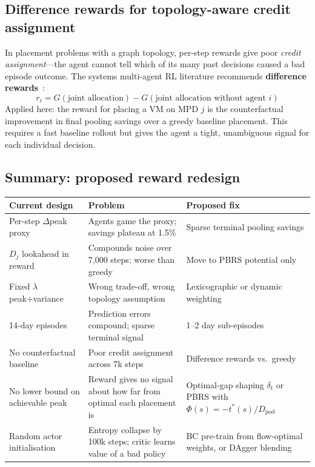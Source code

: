 \documentclass[11pt]{article}
\begin{document}
\subsection{Difference rewards for topology-aware credit assignment}

In placement problems with a graph topology, per-step rewards give poor
\emph{credit assignment}---the agent cannot tell which of its many past decisions
caused a bad episode outcome.  The systems multi-agent RL literature recommends
\textbf{difference rewards}~\cite{wolpert2002diff}:
\begin{equation}
  r_i = G(\text{joint allocation}) - G(\text{joint allocation without agent }i)
\end{equation}
Applied here: the reward for placing a VM on MPD $j$ is the counterfactual
improvement in final pooling savings over a greedy baseline placement.
This requires a fast baseline rollout but gives the agent a tight, unambiguous
signal for each individual decision.

\subsection{Summary: proposed reward redesign}

\begin{center}
\small
\begin{tabular}{p{4.5cm}p{4.5cm}p{4.5cm}}
\toprule
Current design & Problem & Proposed fix \\
\midrule
Per-step $\Delta$peak proxy &
  Agents game the proxy; savings plateau at 1.5\% &
  Sparse terminal pooling savings \\
$D_j$ lookahead in reward &
  Compounds noise over 7{,}000 steps; worse than greedy &
  Move to PBRS potential only \\
Fixed $\lambda$ peak+variance &
  Wrong trade-off, wrong topology assumption &
  Lexicographic or dynamic weighting \\
14-day episodes &
  Prediction errors compound; sparse terminal signal &
  1--2 day sub-episodes \\
No counterfactual baseline &
  Poor credit assignment across 7k steps &
  Difference rewards vs.\ greedy \\
No lower bound on achievable peak &
  Reward gives no signal about how far from optimal each placement is &
  Optimal-gap shaping $\delta_t$ or PBRS with $\Phi(s)=-t^*(s)/D_{\text{pod}}$ \\
Random actor initialisation &
  Entropy collapse by 100k steps; critic learns value of a bad policy &
  BC pre-train from flow-optimal weights, or DAgger blending \\
\bottomrule
\end{tabular}
\end{center}
\end{document}
